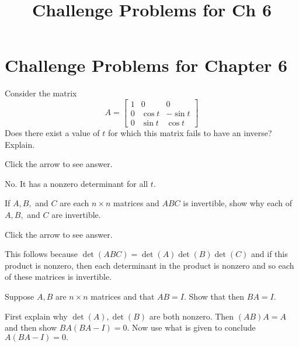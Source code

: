 \documentclass{ximera}
\title{Challenge Problems for Ch 6} \license{CC BY-NC-SA 4.0}
\begin{document}
\begin{abstract}
\end{abstract}
\maketitle

\section*{Challenge Problems for Chapter 6}

\begin{problem}\label{prb:7.32} Consider the matrix
\begin{equation*}
A =
\left[
\begin{array}{ccc}
1 & 0 & 0 \\
0 & \cos t & -\sin t \\
0 & \sin t & \cos t
\end{array}
\right]
\end{equation*}
Does there exist a value of $t$ for which this matrix fails to have an
inverse? Explain.

Click the arrow to see answer.
\begin{expandable}
 No. It has a nonzero determinant for all $t$.
\end{expandable}
\end{problem}

\begin{problem}\label{prb:7.41} If $A,B,$ and $C$ are each $n\times n$ matrices and $ABC$ is
invertible, show why each of $A,B,$ and $C$ are invertible.

Click the arrow to see answer.

\begin{expandable}
This follows
because $\det \left( ABC\right) =\det \left( A\right) \det \left( B\right)
\det \left( C\right) $ and if this product is nonzero, then each determinant
in the product is nonzero and so each of these matrices is invertible.
\end{expandable}
\end{problem}

\begin{problem}\label{prb:7.37} Suppose $A,B$ are $n\times n$ matrices and that $AB=I.$ Show that then
$BA=I.$ 
\begin{hint}
First explain why
$\det \left( A\right) ,\det \left( B\right) $ are both nonzero. Then $\left(
AB\right) A=A$ and then show $BA\left( BA-I\right) =0.$ Now use what
is given to conclude $A\left( BA-I\right) =0.$ 
\end{hint}
\end{problem}
\end{document}
